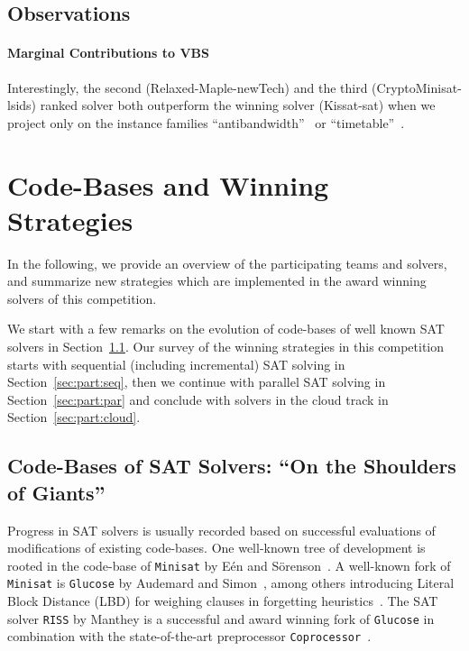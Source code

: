 \documentclass{elsarticle}
\newcommand{\solver}[1]{\texttt{#1}}
\begin{document}
\subsection{Observations}

\paragraph{Marginal Contributions to VBS} Interestingly, the second (Relaxed-Maple-newTech) and the third (CryptoMinisat-lsids) ranked solver both outperform the winning solver (Kissat-sat) when we project only on the instance families ``antibandwidth''~\cite{} or ``timetable''~\cite{}. 


\section{Code-Bases and Winning Strategies}
\label{sec:analysis}

In the following, we provide an overview of the participating teams and solvers, 
and summarize new strategies which are implemented in the award winning solvers of this competition. 

We start with a few remarks on the evolution of code-bases of well known SAT solvers in Section~\ref{sec:codebases}. 
Our survey of the winning strategies in this competition starts with sequential (including incremental) SAT solving in Section~\ref{sec:part:seq}, then we continue with parallel SAT solving in Section~\ref{sec:part:par} and conclude with solvers in the cloud track in Section~\ref{sec:part:cloud}. 


\subsection{Code-Bases of SAT Solvers: ``On the Shoulders of Giants''}
\label{sec:codebases}

Progress in SAT solvers is usually recorded based on successful evaluations of  modifications of existing code-bases. 
One well-known tree of development is rooted in the code-base of \solver{Minisat} by Eén and Sörenson~\cite{Niklas:2003:Minisat}. 
A well-known fork of \solver{Minisat} is \solver{Glucose} by Audemard and Simon~\cite{Audemard:2018:Glucose}, among others introducing Literal Block Distance (LBD) for weighing clauses in forgetting heuristics~\cite{Audemard:2009:Glucose}. 
The SAT solver \solver{RISS} by Manthey is a successful and award winning fork of \solver{Glucose} in combination with the state-of-the-art preprocessor \solver{Coprocessor}~\cite{Manthey:2012:Coprocessor2}. 
\end{document}
